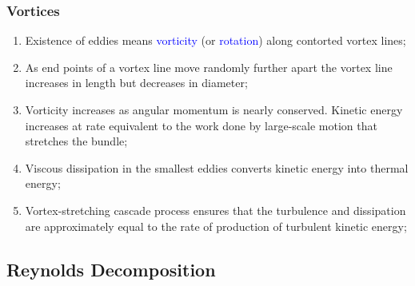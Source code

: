 \documentclass[10pt,compress,handout,ignorenonframetext]{beamer}
\newcommand{\blue}{\textcolor{blue}}
\begin{document}
\begin{frame}
 \frametitle{Vortices}
    \begin{enumerate}%
       \item<1-> Existence of eddies means  \blue{vorticity} (or \blue{rotation}) along contorted vortex lines;
       \item<1-> As end points of a vortex line move randomly further apart the vortex line increases in length but decreases in diameter;
       \item<1-> Vorticity increases as angular momentum is nearly conserved. Kinetic energy increases at rate equivalent to the work done by large-scale motion that stretches the bundle;
       \item<2-> Viscous dissipation in the smallest eddies converts kinetic energy into thermal energy;
       \item<2-> Vortex-stretching cascade process ensures that the turbulence and dissipation are approximately equal to the rate of production of turbulent kinetic energy;
       \end{enumerate} 
\end{frame}

\subsection{Reynolds Decomposition}
\end{document}
